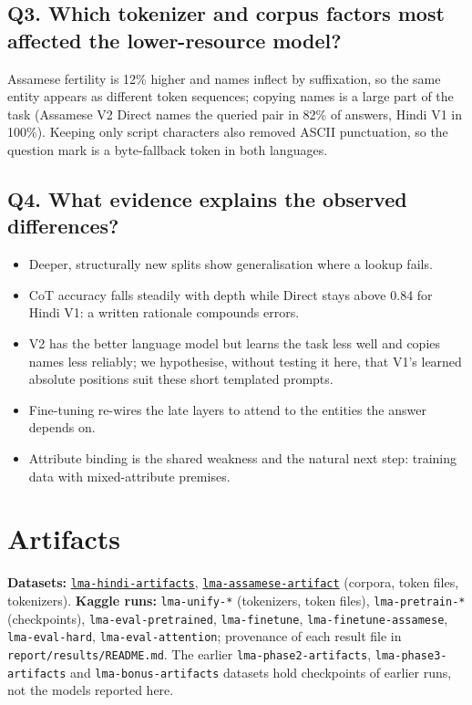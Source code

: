 \documentclass[11pt,a4paper]{article}
\begin{document}
\subsection{Q3. Which tokenizer and corpus factors most affected the lower-resource model?}

Assamese fertility is 12\% higher and names inflect by suffixation, so the same entity appears as different token sequences; copying names is a large part of the task (Assamese V2 Direct names the queried pair in 82\% of answers, Hindi V1 in 100\%). Keeping only script characters also removed ASCII punctuation, so the question mark is a byte-fallback token in both languages.

\subsection{Q4. What evidence explains the observed differences?}

\begin{itemize}
  \item Deeper, structurally new splits show generalisation where a lookup fails.
  \item CoT accuracy falls steadily with depth while Direct stays above 0.84 for Hindi V1: a written rationale compounds errors.
  \item V2 has the better language model but learns the task less well and copies names less reliably; we hypothesise, without testing it here, that V1's learned absolute positions suit these short templated prompts.
  \item Fine-tuning re-wires the late layers to attend to the entities the answer depends on.
  \item Attribute binding is the shared weakness and the natural next step: training data with mixed-attribute premises.
\end{itemize}

\section{Artifacts}

\noindent\textbf{Datasets:} \href{https://www.kaggle.com/datasets/shubhadeepmandal/lma-hindi-artifacts}{\texttt{lma-hindi-artifacts}}, \href{https://www.kaggle.com/datasets/shubhadeepmandal/lma-assamese-artifact}{\texttt{lma-assamese-artifact}} (corpora, token files, tokenizers). \textbf{Kaggle runs:} \texttt{lma-unify-*} (tokenizers, token files), \texttt{lma-pretrain-*} (checkpoints), \texttt{lma-eval-pretrained}, \texttt{lma-finetune}, \texttt{lma-finetune-assamese}, \texttt{lma-eval-hard}, \texttt{lma-eval-attention}; provenance of each result file in \texttt{report/results/README.md}. The earlier \texttt{lma-phase2-artifacts}, \texttt{lma-phase3-artifacts} and \texttt{lma-bonus-artifacts} datasets hold checkpoints of earlier runs, not the models reported here.
\end{document}
